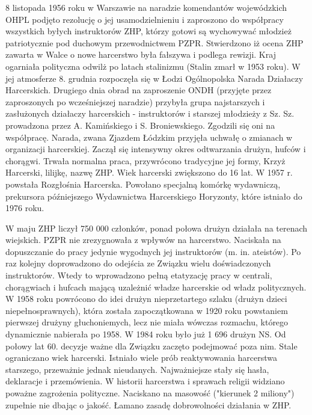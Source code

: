 8 listopada 1956 roku w Warszawie na naradzie komendantów wojewódzkich OHPL podjęto rezolucję o jej usamodzielnieniu i zaproszono do współpracy wszystkich byłych instruktorów ZHP, którzy gotowi są wychowywać młodzież patriotycznie pod duchowym przewodnictwem PZPR. Stwierdzono iż ocena ZHP zawarta w Walce o nowe harcerstwo była fałszywa i podlega rewizji. Kraj ogarniała polityczna odwilż po latach stalinizmu (Stalin zmarł w 1953 roku). W jej atmosferze 8. grudnia rozpoczęła się w Łodzi Ogólnopolska Narada Działaczy Harcerskich. Drugiego dnia obrad na zaproszenie ONDH (przyjęte przez zaproszonych po wcześniejszej naradzie) przybyła grupa najstarszych i zasłużonych działaczy harcerskich - instruktorów i starszej młodzieży z Sz. Sz. prowadzona przez A. Kamińskiego i S. Broniewskiego. Zgodzili się oni na współpracę. Narada, zwana Zjazdem Łódzkim przyjęła uchwałę o zmianach w organizacji harcerskiej. Zaczął się intensywny okres odtwarzania drużyn, hufców i chorągwi. Trwała normalna praca, przywrócono tradycyjne jej formy, Krzyż Harcerski, lilijkę, nazwę ZHP. Wiek harcerski zwiększono do 16 lat. W 1957 r. powstała Rozgłośnia Harcerska. Powołano specjalną komórkę wydawniczą, prekursora późniejszego Wydawnictwa Harcerskiego Horyzonty, które istniało do 1976 roku. 

W maju ZHP liczył 750 000 członków, ponad połowa drużyn działała na terenach wiejskich. PZPR nie zrezygnowała z wpływów na harcerstwo. Naciskała na dopuszczanie do pracy jedynie wygodnych jej instruktorów (m. in. ateistów). Po raz kolejny doprowadzono do odejścia ze Związku wielu doświadczonych instruktorów. Wtedy to wprowadzono pełną etatyzację pracy w centrali, chorągwiach i hufcach mającą uzależnić władze harcerskie od władz politycznych. W 1958 roku powrócono do idei drużyn nieprzetartego szlaku (drużyn dzieci niepełnosprawnych), która została zapoczątkowana w 1920 roku powstaniem pierwszej drużyny głuchoniemych, lecz nie miała wówczas rozmachu, którego dynamicznie nabierała po 1958. W 1984 roku było już 1 696 drużyn NS. Od połowy lat 60. decyzje ważne dla Związku zaczęto podejmować poza nim. Stale ograniczano wiek harcerski. Istniało wiele prób reaktywowania harcerstwa starszego, przeważnie jednak nieudanych. Najważniejsze stały się hasła, deklaracje i przemówienia. W historii harcerstwa i sprawach religii widziano poważne zagrożenia polityczne. Naciskano na masowość ("kierunek 2 miliony") zupełnie nie dbając o jakość. Łamano zasadę dobrowolności działania w ZHP.

